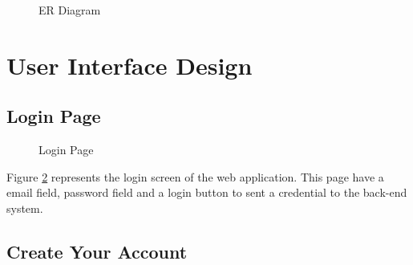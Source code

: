 \documentclass[12pt,oneside,openright,a4paper]{cpe-english-project}
\begin{document}
\begin{figure}[!h]
\centering
{}
\caption{ER Diagram}\label{fig:er-diagram}
\end{figure}


\newpage
\section{User Interface Design}

\subsection{Login Page}

\begin{figure}[!h]
\centering
{}
\caption{Login Page}\label{fig:login}
\end{figure}

Figure \ref{fig:login} represents the login screen of the web application. This page have a email field,  password field and a login button to sent a credential to the back-end system. 

\subsection{Create Your Account }
\end{document}
